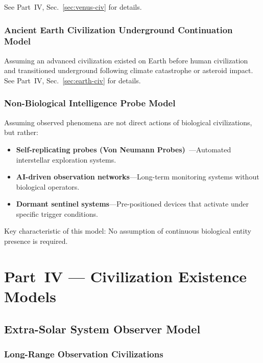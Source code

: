 \documentclass[aps,prd,twocolumn,superscriptaddress,nofootinbib]{revtex4-2}
\begin{document}
See Part~IV, Sec.~\ref{sec:venus-civ} for details.

\subsubsection{Ancient Earth Civilization Underground Continuation Model}\label{sec:earth-remnant}

Assuming an advanced civilization existed on Earth before human civilization and transitioned underground following climate catastrophe or asteroid impact. See Part~IV, Sec.~\ref{sec:earth-civ} for details.

\subsubsection{Non-Biological Intelligence Probe Model}\label{sec:non-bio}

Assuming observed phenomena are not direct actions of biological civilizations, but rather:

\begin{itemize}
  \item \textbf{Self-replicating probes (Von Neumann Probes)}~\cite{Freitas1980}---Automated interstellar exploration systems.
  \item \textbf{AI-driven observation networks}---Long-term monitoring systems without biological operators.
  \item \textbf{Dormant sentinel systems}---Pre-positioned devices that activate under specific trigger conditions.
\end{itemize}

Key characteristic of this model: No assumption of continuous biological entity presence is required.


\section{Part~IV --- Civilization Existence Models}\label{sec:part4}

\subsection{Extra-Solar System Observer Model}\label{sec:observer-model}

\subsubsection{Long-Range Observation Civilizations}\label{sec:long-range}
\end{document}
